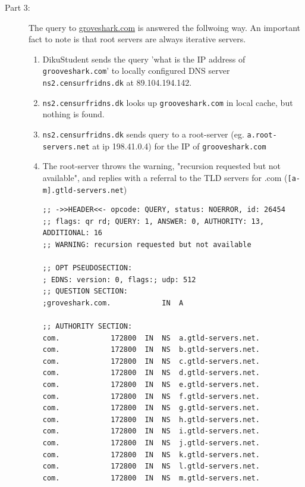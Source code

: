 \begin{description}
    \item[Part 3:] The query to \url{groveshark.com} is answered the follwoing
        way. An important fact to note is that root servers are always
        iterative servers.
        \begin{enumerate}
            \item DikuStudent sends the query 'what is the IP address of
                \texttt{grooveshark.com}' to locally configured DNS server
                \texttt{ns2.censurfridns.dk} at 89.104.194.142.
            \item \texttt{ns2.censurfridns.dk} looks up
                \texttt{grooveshark.com} in local cache, but nothing is found.
            \item \texttt{ns2.censurfridns.dk} sends query to a root-server
                (eg. \texttt{a.root-servers.net} at ip 198.41.0.4) for the
                IP of \texttt{grooveshark.com}
            \item The root-server throws the warning, "recursion requested but
                not available", and replies with a referral to the TLD servers
                for .com (\texttt{[a-m].gtld-servers.net})
                \begin{lstlisting}
;; ->>HEADER<<- opcode: QUERY, status: NOERROR, id: 26454
;; flags: qr rd; QUERY: 1, ANSWER: 0, AUTHORITY: 13, ADDITIONAL: 16
;; WARNING: recursion requested but not available

;; OPT PSEUDOSECTION:
; EDNS: version: 0, flags:; udp: 512
;; QUESTION SECTION:
;groveshark.com.            IN  A

;; AUTHORITY SECTION:
com.            172800  IN  NS  a.gtld-servers.net.
com.            172800  IN  NS  b.gtld-servers.net.
com.            172800  IN  NS  c.gtld-servers.net.
com.            172800  IN  NS  d.gtld-servers.net.
com.            172800  IN  NS  e.gtld-servers.net.
com.            172800  IN  NS  f.gtld-servers.net.
com.            172800  IN  NS  g.gtld-servers.net.
com.            172800  IN  NS  h.gtld-servers.net.
com.            172800  IN  NS  i.gtld-servers.net.
com.            172800  IN  NS  j.gtld-servers.net.
com.            172800  IN  NS  k.gtld-servers.net.
com.            172800  IN  NS  l.gtld-servers.net.
com.            172800  IN  NS  m.gtld-servers.net.


\end{lstlisting}
\end{enumerate}
\end{description}
